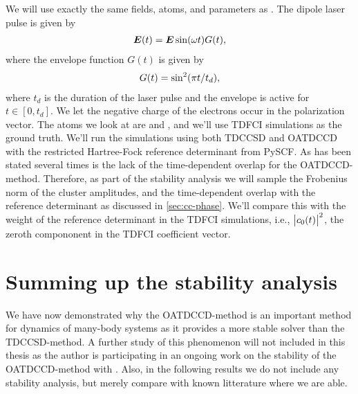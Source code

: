         We will use exactly the same fields, atoms, and parameters as
        \citeauthor{pedersen2018symplectic}.
        The dipole laser pulse is given by
        \begin{align}
            \vfg{E}(t)
            = \vfg{E} \sine(\omega t) G(t),
        \end{align}
        where the envelope function $G(t)$ is given by
        \begin{align}
            G(t)
            = \sine^2(\pi t / t_d),
        \end{align}
        where $t_d$ is the duration of the laser pulse and the envelope is
        active for $t \in [0, t_d]$.
        We let the negative charge of the electrons occur in the polarization
        vector.
        The atoms we look at are  and , and we'll use TDFCI
        simulations as the ground truth.
        We'll run the simulations using both TDCCSD and OATDCCD with the
        restricted Hartree-Fock reference determinant from PySCF.
        As has been stated several times is the lack of the time-dependent
        overlap for the OATDCCD-method.
        Therefore, as part of the stability analysis we will sample the
        Frobenius norm of the cluster amplitudes, and the time-dependent overlap
        with the reference determinant as discussed in \autoref{sec:cc-phase}.
        We'll compare this with the weight of the reference determinant in the
        TDFCI simulations, i.e., $\abs{c_0(t)}^2$, the zeroth compononent in the
        TDFCI coefficient vector.


    \section{Summing up the stability analysis}
        We have now demonstrated why the OATDCCD-method is an important method
        for dynamics of many-body systems as it provides a more stable solver
        than the TDCCSD-method.
        A further study of this phenomenon will not included in this thesis as
        the author is participating in an ongoing work on the stability of the
        OATDCCD-method with \citeauthor{oa-stability} \cite{oa-stability}.
        Also, in the following results we do not include any stability analysis,
        but merely compare with known litterature where we are able.
